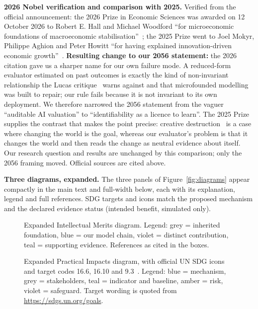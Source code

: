\textbf{2026 Nobel verification and comparison with 2025.} Verified from the official announcement: the 2026 Prize in Economic Sciences was awarded on 12 October 2026 to Robert E. Hall and Michael Woodford ``for microeconomic foundations of macroeconomic stabilisation''~\cite{nobel2026}; the 2025 Prize went to Joel Mokyr, Philippe Aghion and Peter Howitt ``for having explained innovation-driven economic growth''~\cite{nobel2025}. \textbf{Resulting change to our 2056 statement:} the 2026 citation gave us a sharper name for our own failure mode. A reduced-form evaluator estimated on past outcomes is exactly the kind of non-invariant relationship the Lucas critique~\cite{lucas1976} warns against and that microfounded modelling was built to repair; our rule fails because it is not invariant to its own deployment. We therefore narrowed the 2056 statement from the vaguer ``auditable AI valuation'' to ``identifiability as a licence to learn''. The 2025 Prize supplies the contrast that makes the point precise: creative destruction~\cite{aghion1992} is a case where changing the world is the goal, whereas our evaluator's problem is that it changes the world and then reads the change as neutral evidence about itself. Our research question and results are unchanged by this comparison; only the 2056 framing moved. Official sources are cited above.

\textbf{Three diagrams, expanded.} The three panels of Figure~\ref{fig:diagrams} appear compactly in the main text and full-width below, each with its explanation, legend and full references. SDG targets and icons match the proposed mechanism and the declared evidence status (intended benefit, simulated only).

\begin{figure}[H]\centering
\resizebox{0.86\textwidth}{!}{}
\caption{Expanded Intellectual Merits diagram. Legend: grey = inherited foundation, blue = our model chain, violet = distinct contribution, teal = supporting evidence. References as cited in the boxes.}
\end{figure}

\begin{figure}[H]\centering
\resizebox{0.86\textwidth}{!}{}
\caption{Expanded Practical Impacts diagram, with official UN SDG icons and target codes 16.6, 16.10 and 9.3~\cite{un_sdg,un_sdg_icons}. Legend: blue = mechanism, grey = stakeholders, teal = indicator and baseline, amber = risk, violet = safeguard. Target wording is quoted from \url{https://sdgs.un.org/goals}.}
\end{figure}

